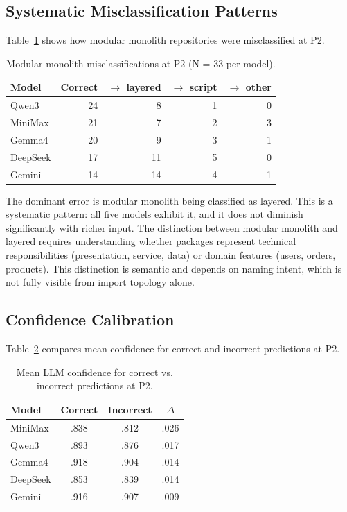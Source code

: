 \subsection{Systematic Misclassification Patterns}
\label{subsec:eval_misclassification}

Table~\ref{tab:eval_mm_errors} shows how modular monolith repositories were misclassified at P2.

\begin{table}[H]
\centering
\small
\caption{Modular monolith misclassifications at P2 (N = 33 per model).}
\label{tab:eval_mm_errors}
\begin{tabular}{lrrrr}
\toprule
\textbf{Model} & \textbf{Correct} & $\to$ \textbf{layered} & $\to$ \textbf{script} & $\to$ \textbf{other} \\
\midrule
Qwen3    & 24 & 8  & 1 & 0 \\
MiniMax  & 21 & 7  & 2 & 3 \\
Gemma4   & 20 & 9  & 3 & 1 \\
DeepSeek & 17 & 11 & 5 & 0 \\
Gemini   & 14 & 14 & 4 & 1 \\
\bottomrule
\end{tabular}
\end{table}

The dominant error is modular monolith being classified as layered. This is a systematic pattern: all five models exhibit it, and it does not diminish significantly with richer input. The distinction between modular monolith and layered requires understanding whether packages represent technical responsibilities (presentation, service, data) or domain features (users, orders, products). This distinction is semantic and depends on naming intent, which is not fully visible from import topology alone.

\subsection{Confidence Calibration}
\label{subsec:eval_confidence}

Table~\ref{tab:eval_confidence} compares mean confidence for correct and incorrect predictions at P2.

\begin{table}[H]
\centering
\small
\caption{Mean LLM confidence for correct vs. incorrect predictions at P2.}
\label{tab:eval_confidence}
\begin{tabular}{lccc}
\toprule
\textbf{Model} & \textbf{Correct} & \textbf{Incorrect} & $\Delta$ \\
\midrule
MiniMax  & .838 & .812 & .026 \\
Qwen3    & .893 & .876 & .017 \\
Gemma4   & .918 & .904 & .014 \\
DeepSeek & .853 & .839 & .014 \\
Gemini   & .916 & .907 & .009 \\
\bottomrule
\end{tabular}
\end{table}

